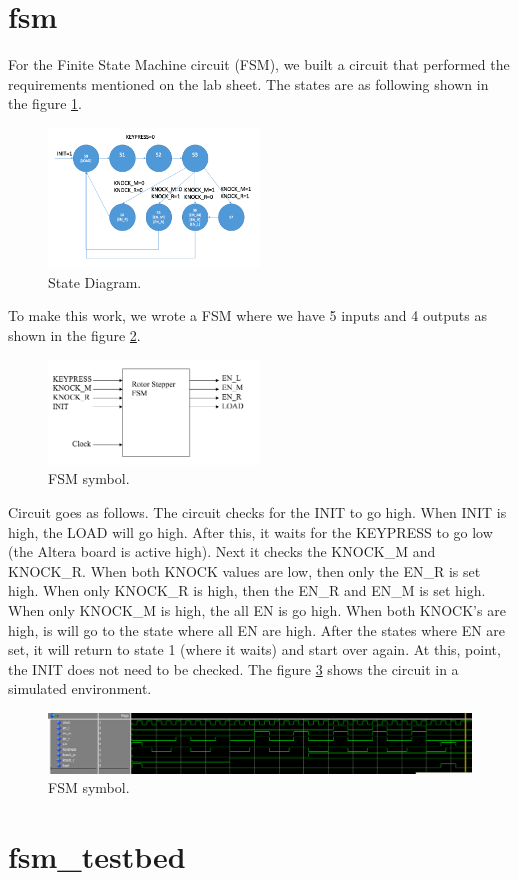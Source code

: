 \documentclass[10pt]{article}
\begin{document}
\section{fsm}
For the Finite State Machine circuit (FSM), we built a circuit that performed the requirements mentioned on the lab sheet. The states are as following shown in the figure \ref{fig:state_diagram}.
\begin{figure}[!htb]
    \centering
    \includegraphics[width=0.5\textwidth]{./state_diagram.png}
    \caption{State Diagram.}
    \label{fig:state_diagram}
\end{figure}
To make this work, we wrote a FSM where we have 5 inputs and 4 outputs as shown in the figure \ref{fig:FSM}.
\begin{figure}[!htb]
    \centering
    \includegraphics[width=0.5\textwidth]{./FSM.png}
    \caption{FSM symbol.}
    \label{fig:FSM}
\end{figure}
Circuit goes as follows. The circuit checks for the INIT to go high. When INIT is high, the LOAD will go high. After this, it waits for the KEYPRESS to go low (the Altera board is active high). Next it checks the KNOCK\_M and KNOCK\_R. When both KNOCK values are low, then only the EN\_R is set high. When only KNOCK\_R is high, then the EN\_R and EN\_M is set high. When only KNOCK\_M is high, the all EN is go high. When both KNOCK's are high, is will go to the state where all EN are high. After the states where EN are set, it will return to state 1 (where it waits) and start over again. At this, point, the INIT does not need to be checked. The figure \ref{fig:fsm_test} shows the circuit in a simulated environment.
\begin{figure}[!htb]
    \centering
    \includegraphics[width=1\textwidth]{./fsm_test.png}
    \caption{FSM symbol.}
    \label{fig:fsm_test}
\end{figure}


\section{fsm\_testbed}
\end{document}
